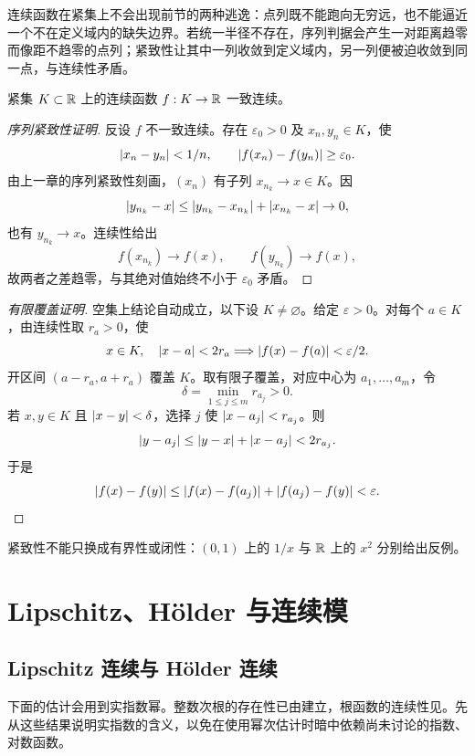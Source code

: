 连续函数在紧集上不会出现前节的两种逃逸：点列既不能跑向无穷远，也不能逼近一个不在定义域内的缺失边界。若统一半径不存在，序列判据会产生一对距离趋零而像距不趋零的点列；紧致性让其中一列收敛到定义域内，另一列便被迫收敛到同一点，与连续性矛盾。


\begin{theorem}
紧集 \(K\subset\mathbb{R}\) 上的连续函数 \(f:K\to\mathbb{R}\) 一致连续。
\end{theorem}

\begin{proof}[序列紧致性证明]
反设 \(f\) 不一致连续。存在 \(\varepsilon_0>0\) 及 \(x_n,y_n\in K\)，使
\[
 \left|x_n-y_n\right|<1/n,\qquad
 \left|f(x_n)-f(y_n)\right|\ge\varepsilon_0.
\]
由上一章的序列紧致性刻画，\((x_n)\) 有子列 \(x_{n_k}\to x\in K\)。因
\[
 \left|y_{n_k}-x\right|
 \le\left|y_{n_k}-x_{n_k}\right|+\left|x_{n_k}-x\right|\to0,
\]
也有 \(y_{n_k}\to x\)。连续性给出
\[
 f(x_{n_k})\to f(x),\qquad f(y_{n_k})\to f(x),
\]
故两者之差趋零，与其绝对值始终不小于 \(\varepsilon_0\) 矛盾。
\end{proof}

\begin{proof}[有限覆盖证明]
空集上结论自动成立，以下设 \(K\ne\varnothing\)。给定 \(\varepsilon>0\)。对每个 \(a\in K\)，由连续性取 \(r_a>0\)，使
\[
 x\in K,\quad\left|x-a\right|<2r_a
 \Longrightarrow\left|f(x)-f(a)\right|<\varepsilon/2.
\]
开区间 \((a-r_a,a+r_a)\) 覆盖 \(K\)。取有限子覆盖，对应中心为 \(a_1,\ldots,a_m\)，令
\[
 \delta=\min_{1\le j\le m}r_{a_j}>0.
\]
若 \(x,y\in K\) 且 \(\left|x-y\right|<\delta\)，选择 \(j\) 使 \(\left|x-a_j\right|<r_{a_j}\)。则
\[
 \left|y-a_j\right|
 \le\left|y-x\right|+\left|x-a_j\right|
 <2r_{a_j}.
\]
于是
\[
 \left|f(x)-f(y)\right|
 \le\left|f(x)-f(a_j)\right|+\left|f(a_j)-f(y)\right|
 <\varepsilon.
\]
\end{proof}

\begin{insightbox}[定义域为什么取紧集]
紧致性不能只换成有界性或闭性：\((0,1)\) 上的 \(1/x\) 与 \(\mathbb{R}\) 上的 \(x^2\) 分别给出反例。
\end{insightbox}

\section{Lipschitz、Hölder 与连续模}

\subsection{Lipschitz 连续与 Hölder 连续}

下面的估计会用到实指数幂。整数次根的存在性已由建立，根函数的连续性见。先从这些结果说明实指数的含义，以免在使用幂次估计时暗中依赖尚未讨论的指数、对数函数。


